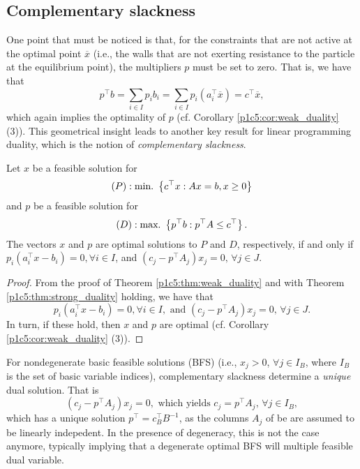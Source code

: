 \subsection{Complementary slackness}

One point that must be noticed is that, for the constraints that are not active at the optimal point $\overline{x}$ (i.e., the walls that are not exerting resistance to the particle at the equilibrium point), the multipliers $p$ must be set to zero. That is, we have that
%
\begin{equation*}
	p^\top b  = \sum_{i \in I} p_ib_i = \sum_{i \in I} p_i(a_i^\top\overline{x}) = c^\top \overline{x},	
\end{equation*}
%
which again implies the optimality of $p$ (cf. Corollary \ref{p1c5:cor:weak_duality} (3)). This geometrical insight leads to another key result for linear programming duality, which is the notion of \emph{complementary slackness}.

\begin{theorem}
	Let $x$ be a feasible solution for 
	\begin{equation*}
		(P) : \mathop{\text{min.~}}\left\{ c^\top x : Ax = b, x \geq 0 \right \}	
	\end{equation*}
	and $p$ be a feasible solution for 
	\begin{equation*}
		(D) : \mathop{\text{max.~}}\left\{ p^\top b : p^\top A \leq c^\top \right \}. 	
	\end{equation*}
	The vectors $x$ and $p$ are optimal solutions to $P$ and $D$, respectively, if and only if
	$p_i(a_i^\top x - b_i) = 0, \forall i \in I$, and $(c_j - p^\top A_j)x_j = 0, \, \forall j \in J$. 
\end{theorem}

\begin{proof} 
	From the proof of Theorem \ref{p1c5:thm:weak_duality} and with Theorem \ref{p1c5:thm:strong_duality} holding, we have that 
%
	\begin{equation*}
		p_i(a_i^\top x - b_i) = 0, \forall i \in I, \text{ and } 	
	(c_j - p^\top A_j)x_j = 0, \, \forall j \in J.
	\end{equation*}
%
	In turn, if these hold, then $x$ and $p$ are optimal (cf. Corollary \ref{p1c5:cor:weak_duality} (3)). 
\end{proof}

For nondegenerate basic feasible solutions (BFS) (i.e., $x_j > 0$, $\forall j \in I_B$, where $I_B$ is the set of basic variable indices), complementary slackness determine a \emph{unique} dual solution. That is
%
\begin{equation*}
	(c_j - p^\top A_j)x_j = 0, \text{ which yields } c_j = p^\top A_j, \, \forall j \in I_B,
\end{equation*}
%
which has a unique solution $p^\top = c_B^\top B^{-1}$, as the columns $A_j$ of be are assumed to be linearly indepedent. In the presence of degeneracy, this is not the case anymore, typically implying that a degenerate optimal BFS will multiple feasible dual variable.


